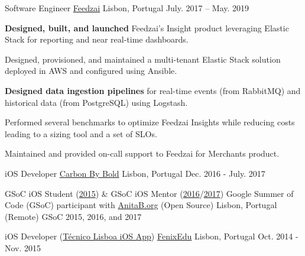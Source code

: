 \begin{cventries}
    
  \cventry
    {Software Engineer}
    {\href{https://feedzai.com/}{Feedzai}}
    {Lisbon, Portugal}
    {July. 2017 – May. 2019}
    {
      \begin{cvitems}
        \item \textbf{Designed, built, and launched} Feedzai's Insight product leveraging Elastic Stack for reporting and near real-time dashboards.
        \item Designed, provisioned, and maintained a multi-tenant Elastic Stack solution deployed in AWS and configured using Ansible.
        \item \textbf{Designed data ingestion pipelines} for real-time events (from RabbitMQ) and historical data (from PostgreSQL) using Logstash.
        \item Performed several benchmarks to optimize Feedzai Insights while reducing costs leading to a sizing tool and a set of SLOs.
        \item Maintained and provided on-call support to Feedzai for Merchants product.
      \end{cvitems}
      \vspace{4mm}
    }

  \cventryShort
    {iOS Developer}
    {\href{https://www.carbonbybold.com/pt-pt/}{Carbon By Bold}}
    {Lisbon, Portugal}
    {Dec. 2016 - July. 2017}

  \cventryShort
    {GSoC iOS Student (\href{https://docs.google.com/presentation/d/1yv4XuNNpTgDkyOjL9SSjGe7PSZuwpbah42mQCACxdXQ/}{2015}) \& GSoC iOS Mentor (\href{https://summerofcode.withgoogle.com/archive/2016/projects/5509901874888704/}{2016}/\href{https://summerofcode.withgoogle.com/archive/2017/projects/5508656065937408/}{2017})}
    {Google Summer of Code (GSoC) participant with \href{http://anitaborg.org/}{AnitaB.org} (Open Source)}
    {Lisbon, Portugal (Remote)}
    {GSoC 2015, 2016, and 2017}
    
  \cventryShort
    {iOS Developer (\href{https://apps.apple.com/us/app/tecnico-lisboa/id959976468}{Técnico Lisboa iOS App})}
    {\href{http://fenixedu.org/}{FenixEdu}}
    {Lisbon, Portugal}
    {Oct. 2014 - Nov. 2015}

\end{cventries}
